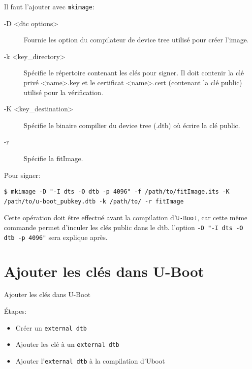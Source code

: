 \documentclass[aspectratio=169]{beamer}
\begin{document}
\begin{frame}[fragile]
Il faut l'ajouter avec \texttt{mkimage}:
\begin{description}
\item[-D <dtc options>] Fournie les option du compilateur de device tree utilisé pour créer l'image.
\item[-k <key\_directory>] Spécifie le répertoire contenant les clés pour signer. Il doit contenir la clé privé <name>.key et le certificat <name>.cert (contenant la clé public) utilisé pour la vérification.
\item[-K <key\_destination>] Spécifie le binaire compilier du device tree (.dtb) où écrire la clé public.
\item[-r] Spécifie la fitImage.
\end{description}
\end{frame}

\begin{frame}[fragile]
Pour signer:
\begin{lstlisting}[style=shell]
$ mkimage -D "-I dts -O dtb -p 4096" -f /path/to/fitImage.its -K /path/to/u-boot_pubkey.dtb -k /path/to/ -r fitImage
\end{lstlisting}
Cette opération doit être effectué avant la compilation d'\texttt{U-Boot}, car cette même commande permet d'inculer les clés public dans le dtb.
\vfill
l'option \texttt{-D "-I dts -O dtb -p 4096"} sera explique après.
\end{frame}



\section{Ajouter les clés dans U-Boot}

\begin{frame}
\begin{center}
\huge{Ajouter les clés dans U-Boot}
\end{center}
\end{frame}

\begin{frame}
Étapes:
\begin{center}
\begin{itemize}
	\item Créer un \texttt{external dtb}
	\item Ajouter les clé à un \texttt{external dtb}
	\item Ajouter l'\texttt{external dtb} à la compilation d'Uboot
\end{itemize}
\end{center}
\end{frame}
\end{document}
